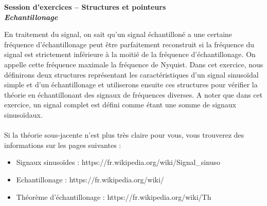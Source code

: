 \documentclass[11pt]{article}
\begin{document}
\begin{center}{\bf Session d'exercices -- Structures et pointeurs}\\
\textbf{\emph{Echantillonage}}
\end{center}

En traitement du signal, on sait qu'un signal échantilloné a une certaine fréquence d'échantillonage peut être parfaitement reconstruit si la fréquence du signal est strictement inférieure à la moitié de la fréquence d'échantillonage. On appelle cette fréquence maximale la fréquence de Nyquist. Dans cet exercice, nous définirons deux structures représentant les caractéristiques d'un signal sinusoïdal simple et d'un échantillonage et utiliserons ensuite ces structures pour vérifier la théorie en échantillonant des signaux de fréquences diverses. A noter que dans cet exercice, un signal complet est défini comme étant une somme de signaux sinusoïdaux.\\
\\
Si la théorie sous-jacente n'est plus très claire pour vous, vous trouverez des informations sur les pages suivantes : 
\begin{itemize}
\item Signaux sinusoïdes : https://fr.wikipedia.org/wiki/Signal_sinuso%
\item Echantillonage : https://fr.wikipedia.org/wiki/%
\item Théorème d'échantillonage : https://fr.wikipedia.org/wiki/Th%
\end{itemize}
\end{document}
